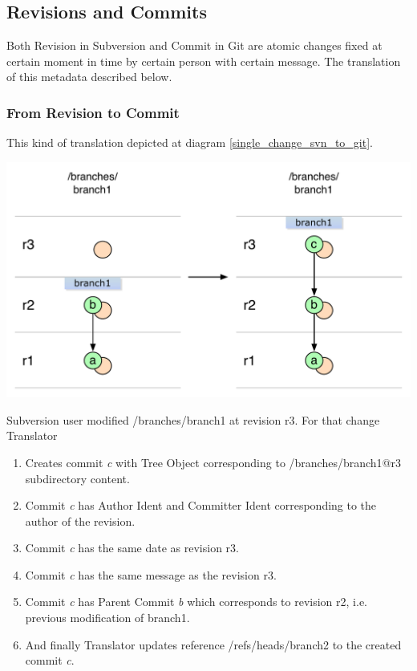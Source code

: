 \subsection{Revisions and Commits}
\renewcommand{\figurename}{Diagram}

Both Revision in Subversion and Commit in Git are atomic changes fixed at certain moment in time by certain person with certain message. The translation of this metadata described below.

\subsubsection{From Revision to Commit}

This kind of translation depicted at diagram \ref{single_change_svn_to_git}.
\begin{center}
\includegraphics[width=\textwidth]{img/diagrams/single_change_svn_to_git.pdf}%
\label{single_change_svn_to_git}%
\end{center}

Subversion user modified /branches/branch1 at revision r3. For that change Translator
\begin{enumerate}
	\compactlist
	\item Creates commit \emph{c} with Tree Object corresponding to /branches/branch1@r3 subdirectory content.
	\item Commit \emph{c} has Author Ident and Committer Ident corresponding to the author of the revision.
	\item Commit \emph{c} has the same date as revision r3.
	\item Commit \emph{c} has the same message as the revision r3.
	\item Commit \emph{c} has Parent Commit \emph{b} which corresponds to revision r2, i.e. previous modification of branch1.
	\item And finally Translator updates reference /refs/heads/branch2 to the created commit \emph{c}.
\end{enumerate}

